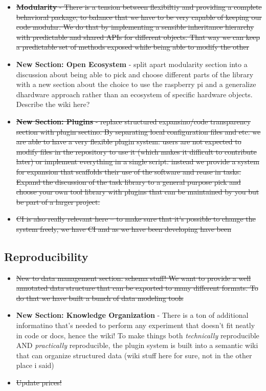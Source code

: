 \begin{itemize}
\item \sout{\textbf{Modularity} - There is a tension between flexibiltiy and providing a complete behavioral package, to balance that we have to be very capable of keeping our code modular. We do that by implementing a sensible inheritance hierarchy with predictable and shared APIs for different objects. That way we can keep a predictable set of methods exposed while being able to modify the other}
\item \textbf{New Section: Open Ecosystem} - split apart modularity section into a discussion about being able to pick and choose different parts of the library with a new section about the choice to use the raspberry pi and a generalize dhardware approach rather than an ecosystem of specific hardware objects. Describe the wiki here?
\item \sout{\textbf{New Section: Plugins} - replace structured expansino/code transparency section with plugin sectino. By separating local configuration files and etc. we are able to have a very flexible plugin system: users are not expected to modify files in the repository to use it (which makes it difficult to contribute later) or implement everything in a single script. instead we provide a system for expansion that scaffolds their use of the software and reuse in tasks. Expand the discussion of the task library to a general purpose pick and choose your own tool library with plugins that can be maintained by you but be part of a larger project.}
\item \sout{CI is also really relevant here -- to make sure that it's possible to change the system freely, we have CI and as we have been developing have been}

\end{itemize}

\subsection{Reproducibility}

\begin{itemize}
\item \sout{New to data management section: schema stuff! We want to provide a well annotated data structure that can be exported to many different formats. To do that we have built a bunch of data modeling tools}
\item \textbf{New Section: Knowledge Organization} - There is a ton of additional informatino that's needed to perform any experiment that doesn't fit neatly in code or docs, hence the wiki! To make things both \textit{technically} reproducible AND \textit{practically} reproducible, the plugin system is built into a semantic wiki that can organize structured data (wiki stuff here for sure, not in the other place i said)
\item \sout{Update prices!}
\end{itemize}

